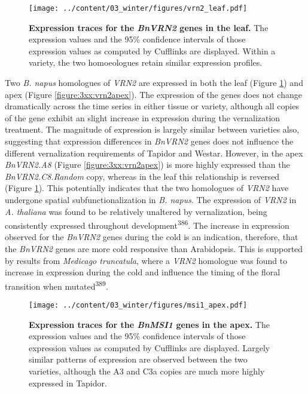 \documentclass[12pt,]{book}
\begin{document}
\begin{figure}[htbp]
\centering
\texttt{[image: ../content/03\_winter/figures/vrn2\_leaf.pdf]}
\caption{\textbf{Expression traces for the \emph{BnVRN2} genes in the
leaf.} The expression values and the 95\% confidence intervals of those
expression values as computed by Cufflinks are displayed. Within a
variety, the two homoeologues retain similar expression
profiles.}\label{figure:3xx:vrn2leaf}
\end{figure}

Two \emph{B. napus} homologues of \emph{VRN2} are expressed in both the
leaf (Figure \ref{figure:3xx:vrn2leaf}) and apex (Figure
\ref{figure:3xx:vrn2apex}). The expression of the genes does not change
dramatically across the time series in either tissue or variety,
although all copies of the gene exhibit an slight increase in expression
during the vernalization treatment. The magnitude of expression is
largely similar between varieties also, suggesting that expression
differences in \emph{BnVRN2} genes does not influence the different
vernalization requirements of Tapidor and Westar. However, in the apex
\emph{BnVRN2.A8} (Figure \ref{figure:3xx:vrn2apex}) is more highly
expressed than the \emph{BnVRN2.C8.Random} copy, whereas in the leaf
this relationship is reversed (Figure \ref{figure:3xx:vrn2leaf}). This
potentially indicates that the two homologues of \emph{VRN2} have
undergone spatial subfunctionalization in \emph{B. napus}. The
expression of \emph{VRN2} in \emph{A. thaliana} was found to be
relatively unaltered by vernalization, being consistently expressed
throughout development\textsuperscript{386}. The increase in expression
observed for the \emph{BnVRN2} genes during the cold is an indication,
therefore, that the \emph{BnVRN2} genes are more cold responsive than
Arabidopsis. This is supported by results from \emph{Medicago
truncatula}, where a \emph{VRN2} homologue was found to increase in
expression during the cold and influence the timing of the floral
transition when mutated\textsuperscript{389}.

\begin{figure}[htbp]
\centering
\texttt{[image: ../content/03\_winter/figures/msi1\_apex.pdf]}
\caption{\textbf{Expression traces for the \emph{BnMSI1} genes in the
apex.} The expression values and the 95\% confidence intervals of those
expression values as computed by Cufflinks are displayed. Largely
similar patterns of expression are observed between the two varieties,
although the A3 and C3a copies are much more highly expressed in
Tapidor.}\label{figure:3xx:msiapex}
\end{figure}
\end{document}
